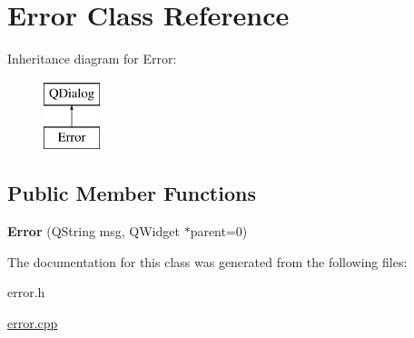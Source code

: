 \hypertarget{classError}{\section{Error Class Reference}
\label{classError}
}
Inheritance diagram for Error\-:\begin{figure}[H]
\begin{center}
\leavevmode
\includegraphics[height=2.000000cm]{classError}
\end{center}
\end{figure}
\subsection*{Public Member Functions}
\begin{DoxyCompactItemize}
\item 
\hypertarget{classError_a024638e93b49ba6024aa01eadb0f9d5b}{{\bfseries Error} (Q\-String msg, Q\-Widget $\ast$parent=0)}\label{classError_a024638e93b49ba6024aa01eadb0f9d5b}

\end{DoxyCompactItemize}


The documentation for this class was generated from the following files\-:\begin{DoxyCompactItemize}
\item 
error.\-h\item 
\hyperlink{error_8cpp}{error.\-cpp}\end{DoxyCompactItemize}
